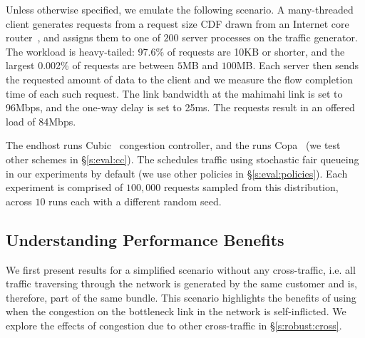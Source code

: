 Unless otherwise specified, we emulate the following scenario.
A many-threaded client generates requests from a request size CDF drawn from an Internet core router~\cite{caida-dataset}, and assigns them to one of $200$ server processes on the traffic generator.
The workload is heavy-tailed: 97.6\% of requests are 10KB or shorter, and the largest 0.002\% of requests are between $5$MB and $100$MB.
Each server then sends the requested amount of data to the client and we measure the flow completion time of each such request. 
The link bandwidth at the mahimahi link is set to 96Mbps, and the one-way delay is set to 25ms. The requests result in an offered load of 84Mbps. 

The endhost runs Cubic~\cite{cubic} congestion controller, and the \inbox runs Copa~\cite{copa} (we test other schemes in \S\ref{s:eval:cc}). The \inbox schedules traffic using stochastic fair queueing~\cite{sfq} in our experiments by default (we use other policies in \S\ref{s:eval:policies}). Each experiment is comprised of $100,000$ requests sampled from this distribution, across $10$ runs each with a different random seed. 

\subsection{Understanding Performance Benefits}\label{s:eval:fct}

We first present results for a simplified scenario without any cross-traffic, i.e. all traffic traversing through the network is generated by the same customer and is, therefore, part of the same bundle. 
This scenario highlights the benefits of using \name when the congestion on the bottleneck link in the network is self-inflicted. We explore the effects of congestion due to other cross-traffic in \S\ref{s:robust:cross}.

%
%

